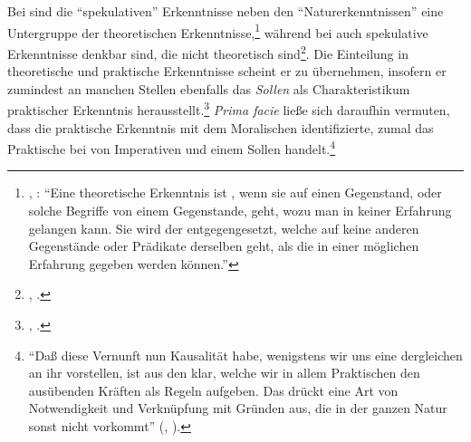 Bei  sind die \enquote{spekulativen} Erkenntnisse neben den
\enquote{Naturerkenntnissen} eine Untergruppe der theoretischen
Erkenntnisse,\footnote{\cite[Vgl.][B 662f.]{Kant:KritikderreinenVernunft2003}, \cite[][III:
422.16--20]{Kant:GesammelteWerke1900ff.}:
\enquote{Eine theoretische Erkenntnis ist , wenn sie auf einen
Gegenstand, oder solche Begriffe von einem Gegenstande, geht, wozu man in keiner
Erfahrung gelangen kann. Sie wird der  entgegengesetzt,
welche auf keine anderen Gegenstände oder Prädikate derselben geht, als die in
einer möglichen Erfahrung gegeben werden können.}} während bei
 auch spekulative Erkenntnisse denkbar sind,
die nicht theoretisch
sind\footnote{\cite[Vgl.][62]{Meier:AuszugausderVernunftlehre1752}, \cite[][XVI:
517.29--31]{Kant:GesammelteWerke1900ff.}.}.
Die Einteilung in theoretische und praktische Erkenntnisse scheint er zu
übernehmen, insofern er zumindest an manchen Stellen ebenfalls das \emph{Sollen}
als Charakteristikum praktischer Erkenntnis herausstellt.\footnote{\cite[Siehe
z.\,B.][B 661]{Kant:KritikderreinenVernunft2003}, \cite[][III:
421.17--19]{Kant:GesammelteWerke1900ff.}.} \emph{Prima facie} ließe sich daraufhin
vermuten, dass  die praktische Erkenntnis mit dem
Moralischen identifizierte, zumal das Praktische bei  von
Imperativen und einem Sollen
handelt.\footnote{\enquote{Daß diese Vernunft
nun Kausalität habe, wenigstens wir uns eine dergleichen an ihr vorstellen, ist
aus den  klar, welche wir in allem Praktischen den ausübenden
Kräften als Regeln aufgeben. Das  drückt eine Art von Notwendigkeit
und Verknüpfung mit Gründen aus, die in der ganzen Natur sonst nicht vorkommt}
\mkbibparens{\cite[][B 575]{Kant:KritikderreinenVernunft2003},
\cite[III: 371.15--17]{Kant:GesammelteWerke1900ff.}}.}

